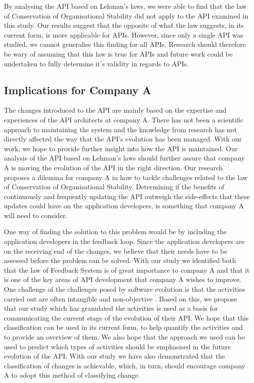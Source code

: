 \documentclass{sig-alternate}
\begin{document}
By analysing the API based on Lehman's laws, we were able to find that the law of Conservation of Organisational Stability did not apply to the API examined in this study. Our results suggest that the opposite of what the law suggests, in its current form, is more applicable for APIs. However, since only a single API was studied, we cannot generalise this finding for all APIs. Research should therefore be wary of assuming that this law is true for APIs and future work could be undertaken to fully determine it's validity in regards to APIs.

\newpage

\subsection{Implications for Company A}
The changes introduced to the API are mainly based on the expertise and experiences of the API architects at company A. There has not been a scientific approach to maintaining the system and the knowledge from research has not directly affected the way that the API's evolution has been managed. With our work, we hope to provide further insight into how the API is maintained. Our analysis of the API based on Lehman's laws should further assure that company A is moving the evolution of the API in the right direction. Our research proposes a dilemma for company A in how to tackle challenges related to the law of Conservation of Organisational Stability. Determining if the benefits of continuously and frequently updating the API outweigh the side-effects that these updates could have on the application developers, is something that company A will need to consider.

One way of finding the solution to this problem would be by including the application developers in the feedback loop. Since the application developers are on the receiving end of the changes, we believe that their needs have to be assessed before the problem can be solved. With our study we identified both that the law of Feedback System is of great importance to company A and that it is one of the key areas of API development that company A wishes to improve. One challenge of the challenges posed by software evolution is that the activities carried out are often intangible and non-objective \cite{chapin2001types, lientz1980software}. Based on this, we propose that our study which has granulated the activities is used as a basis for communicating the current stage of the evolution of their API. We hope that this classification can be used in its current form, to help quantify the activities and to provide an overview of them. We also hope that the approach we used can be used to predict which types of activities should be emphasised in the future evolution of the API. With our study we have also demonstrated that the classification of changes is achievable, which, in turn, should encourage company A to adopt this method of classifying change.
\end{document}
